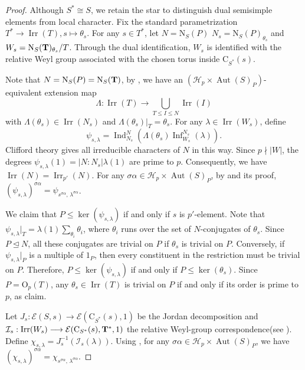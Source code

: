 \documentclass[11pt,a4paper]{article}
\numberwithin{equation}{section}
\theoremstyle{definition}
\theoremstyle{remark}
\newcommand{\Irr}{\operatorname{Irr}}
\newcommand{\Aut}{\operatorname{Aut}}
\newcommand{\Inf}{\operatorname{Inf}}
\newcommand{\OO}{\mathrm{O}}
\newcommand{\HH}{\mathcal H}
\newcommand{\NN}{\mathrm N}
\newcommand{\CC}{\mathrm C}
\newcommand{\Ind}{\operatorname{Ind}}
\begin{document}
\begin{proof}
Although \(S^*\cong S\), we retain the star to distinguish dual semisimple elements from local character. Fix the standard parametrization
$T^*\longrightarrow\Irr(T), s\mapsto\theta_s$.
For any \(s\in T^*\), let $N=\NN_S(P)$ $N_s=\NN_S(P)_{\theta_s}$ and $W_s=\NN_S({\bf T})_{\theta_s}/T$. Through the dual identification, \(W_s\) is identified with the relative Weyl group associated with the chosen torus inside \(\CC_{S^*}(s)\).

Note that $N=\NN_S(P)=\NN_S({\bf T})$, by \cite[Lemma 3.3]{Johansson}, we have an $(\HH_p\times \Aut(S)_P)$-equivalent  extension map 
\[
\Lambda:\Irr(T)\longrightarrow\bigcup_{T\leq I\leq N}\Irr(I)
\]
with $\Lambda(\theta_s)\in\Irr(N_s)$ and $\Lambda(\theta_s)|_T=\theta_s$.
For any $\lambda\in\Irr(W_s)$, define 
\[
\psi_{s,\lambda}=\Ind_{N_s}^{N}(\Lambda(\theta_s)\Inf_{W_s}^{N_s}(\lambda)).
\]
Clifford theory gives all irreducible characters of \(N\) in this way. Since \(p\nmid |W|\), the degrees
$\psi_{s,\lambda}(1)=|N:N_s|\lambda(1)$ are prime to \(p\). Consequently, we have $\Irr(N)=\Irr_{p'}(N)$. 
For any $\sigma\alpha\in\HH_p\times \Aut(S)_P$, by \cite[Proposition 3.4]{Johansson} and its proof,   $(\psi_{s,\lambda})^{\sigma\alpha}=
\psi_{s^{\sigma\alpha},\,\lambda^{\sigma\alpha}}$.

We claim that $P\leq\ker(\psi_{s,\lambda})$ if and only if $s$ is $p'$-element.  Note that 
$\psi_{s,\lambda}|_T=\lambda(1)
\sum_{\theta_i}\theta_i$, where $\theta_i$ runs over the set of \(N\)-conjugates of \(\theta_s\). Since \(P\unlhd N\), all these conjugates are trivial on \(P\)
if \(\theta_s\) is trivial on \(P\). Conversely, if \(\psi_{s,\lambda}|_P\) is a multiple of \(1_P\), then every constituent in the restriction must be
trivial on \(P\). Therefore, $P\leq\ker(\psi_{s,\lambda})$ if and only if 
$P\leq\ker(\theta_s)$. Since $P=\OO_p(T)$,
any  \(\theta_s\in\Irr(T)\) is trivial on \(P\) if and only if its order is prime to \(p\), as claim.

Let $J_s:\mathcal{E}(S,s)\longrightarrow\mathcal{E}(\CC_{S^*}(s),1)$ be the Jordan decomposition and 
$\mathcal I_s:\Irr(W_s)\longrightarrow
\mathcal{E}(\CC_{S^*}(s),{\bf T}^*,1)$ the relative Weyl-group correspondence(see \cite[Sections 3.1-3.2]{Johansson}).  Define $\chi_{s,\lambda}=J_s^{-1}(\mathcal I_s(\lambda))$. Using \cite[Theorem B and Proposition~3.2]{Johansson}, for any $\sigma\alpha\in\HH_p\times \Aut(S)_P$,  we have  $(\chi_{s,\lambda})^{\sigma\alpha}=
\chi_{s^{\sigma\alpha},\,\lambda^{\sigma\alpha}}$.


\end{proof}
\end{document}

